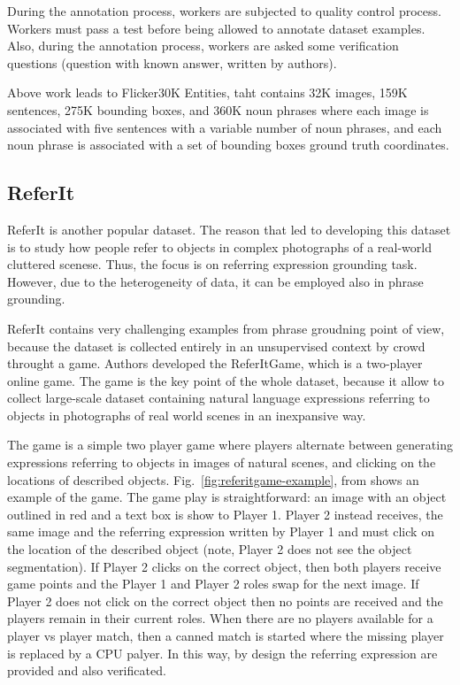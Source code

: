 During the annotation process, workers are subjected to quality
control process. Workers must pass a test before being allowed to
annotate dataset examples. Also, during the annotation process,
workers are asked some verification questions (question with known
answer, written by authors).

Above work leads to Flicker30K Entities, taht contains 32K images,
159K sentences, 275K bounding boxes, and 360K noun phrases where each
image is associated with five sentences with a variable number of noun
phrases, and each noun phrase is associated with a set of bounding
boxes ground truth coordinates. 

\subsection{ReferIt}

ReferIt  is another popular dataset. The reason that led to developing this dataset is to study how people refer to objects in complex photographs of a real-world cluttered scenese. Thus, the focus is on referring expression grounding task. However, due to the heterogeneity of data, it can be employed also in phrase grounding.

ReferIt contains very challenging examples from phrase groudning point
of view, because the dataset is collected entirely in an unsupervised
context by crowd throught a game. Authors developed the ReferItGame,
which is a two-player online game. The game is the key point of the
whole dataset, because it allow to collect large-scale dataset
containing natural language expressions referring to objects in
photographs of real world scenes in an inexpansive way.

The game is a simple two player game where players alternate between
generating expressions referring to objects in images of natural
scenes, and clicking on the locations of described objects.
Fig.~\ref{fig:referitgame-example}, from 
shows an example of the game. The game play is straightforward: an
image with an object outlined in red and a text box is show to Player
1. Player 2 instead receives, the same image and the referring
expression written by Player 1 and must click on the location of the
described object (note, Player 2 does not see the object
segmentation). If Player 2 clicks on the correct object, then both
players receive game points and the Player 1 and Player 2 roles swap
for the next image. If Player 2 does not click on the correct object
then no points are received and the players remain in their current
roles. When there are no players available for a player vs player
match, then a canned match is started where the missing player is
replaced by a CPU palyer. In this way, by design the referring
expression are provided and also verificated. 

